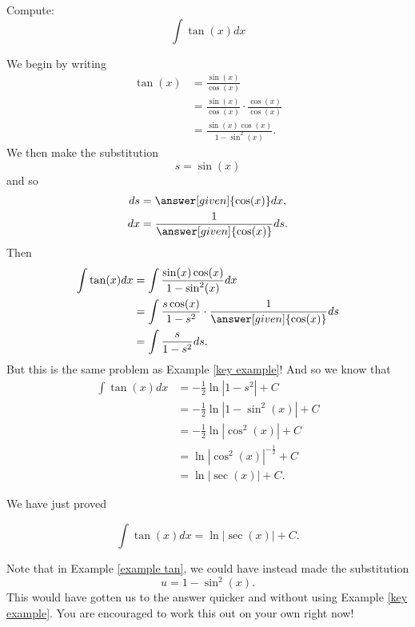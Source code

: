 \documentclass{ximera}
\begin{document}

\begin{example}\label{example tan}
Compute:
\[
\int \tan(x) dx
\]
\begin{explanation}
We begin by writing
\begin{align*}
\tan(x) &= \frac{\sin(x)}{\cos(x)}  \\
&= \frac{\sin(x)}{\cos(x)} \cdot \frac{\cos(x)}{\cos(x)}  \\
&= \frac{\sin(x) \cos(x)}{1 - \sin^2(x)}.
\end{align*}
We then make the substitution
\[
s = \sin(x)
\]
and so
\begin{align*}
ds &= \answer[given]{\cos(x)} dx,\\
dx &= \frac{1}{\answer[given]{\cos(x)}} ds.
\end{align*}
Then
\begin{align*}
\int \tan(x) dx &= \int \frac{\sin(x) \cos(x)}{1 - \sin^2(x)} dx  \\
&= \int \frac{s \cos(x)}{1 - s^2} \cdot \frac{1}{\answer[given]{\cos(x)}} ds  \\
&= \int \frac{s}{1-s^2} ds.
\end{align*}
But this is the same problem as Example \ref{key example}!  
And so we know that
\begin{align*}
\int \tan(x) dx &= - \frac{1}{2} \ln|1-s^2| + C  \\
&= - \frac{1}{2} \ln|1-\sin^2 (x)| + C  \\
&= - \frac{1}{2} \ln|\cos^2(x)| + C  \\
&= \ln|\cos^2(x)|^{- \frac{1}{2}} + C  \\
&= \ln|\sec(x)| + C.
\end{align*}
\end{explanation}
\end{example}

We have just proved

\begin{theorem}
\[
\int \tan(x) dx = \ln|\sec(x)| + C.
\]
\end{theorem}

Note that in Example \ref{example tan}, we could have instead made the substitution
\[
u = 1-\sin^2(x).
\]
This would have gotten us to the answer quicker and without using Example \ref{key example}.  
You are encouraged to work this out on your own right now!
\end{document}
